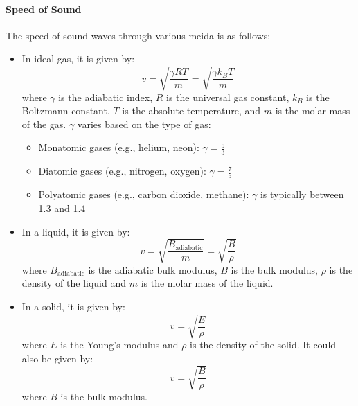 \documentclass[11pt]{report}
\begin{document}
\paragraph{Speed of Sound} The speed of sound waves through various meida is as follows:
\begin{itemize}
    \item In ideal gas, it is given by:
    \begin{equation}
        v = \sqrt{\frac{\gamma RT}{m}} = \sqrt{\frac{\gamma k_B T}{m}}
    \end{equation}
    where \( \gamma \) is the adiabatic index, \( R \) is the universal gas constant, \( k_B \) is the Boltzmann constant, \( T \) is the absolute temperature, and \( m \) is the molar mass of the gas. $\gamma$ varies based on the type of gas:
    \begin{itemize}
        \item Monatomic gases (e.g., helium, neon): \( \gamma = \frac{5}{3} \)
        \item Diatomic gases (e.g., nitrogen, oxygen): \( \gamma = \frac{7}{5} \)
        \item Polyatomic gases (e.g., carbon dioxide, methane): \( \gamma \) is typically between 1.3 and 1.4
    \end{itemize}
    \item In a liquid, it is given by:
    \begin{equation}
        v = \sqrt{\frac{B_{\text{adiabatic}}}{m}} = \sqrt{\frac{B}{\rho}}
    \end{equation}
    where \(B_{\text{adiabatic}}\) is the adiabatic bulk modulus, \( B \) is the bulk modulus, \( \rho \) is the density of the liquid and \( m \) is the molar mass of the liquid.
    \item In a solid, it is given by:
    \begin{equation}
        v = \sqrt{\frac{E}{\rho}} 
    \end{equation}
    where \( E \) is the Young's modulus and \( \rho \) is the density of the solid. It could also be given by:
    $$
        v = \sqrt{\frac{B}{\rho}}
    $$
    where \( B \) is the bulk modulus.
\end{itemize}
\end{document}
